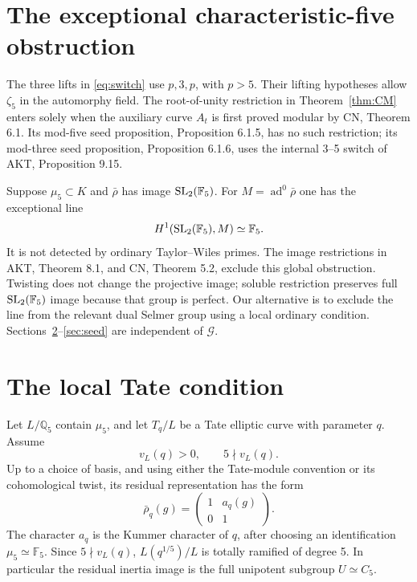 \documentclass[11pt,a4paper]{article}
\theoremstyle{definition}\newtheorem{definition}[theorem]{Definition}
\theoremstyle{remark}\newtheorem*{remark}{Remark}
\newcommand{\Q}{\mathbb Q}\newcommand{\Z}{\mathbb Z}
\newcommand{\F}{\mathbb F}\newcommand{\OO}{\mathcal O}
\newcommand{\ad}{\operatorname{ad}}\newcommand{\Inf}{\operatorname{Inf}}
\newcommand{\Ginput}{\mathcal G}
\begin{document}
\section{The exceptional characteristic-five obstruction}
\label{sec:exception}

The three lifts in \eqref{eq:switch} use $p,3,p$, with $p>5$. Their lifting
hypotheses allow $\zeta_5$ in the automorphy field. The root-of-unity restriction
in Theorem~\ref{thm:CM} enters solely when the auxiliary curve $A_t$ is first
proved modular by CN, Theorem 6.1. Its mod-five seed proposition, Proposition
6.1.5, has no such restriction; its mod-three seed proposition, Proposition
6.1.6, uses the internal 3--5 switch of AKT, Proposition 9.15.

Suppose $\mu_5\subset K$ and $\bar\rho$ has image $\SL_2(\F_5)$.
For $M=\ad^0\bar\rho$ one has the exceptional line
\begin{equation}\label{eq:lie}
H^1(\SL_2(\F_5),M)\simeq\F_5.
\end{equation}
It is not detected by ordinary Taylor--Wiles primes. The image restrictions in
AKT, Theorem 8.1, and CN, Theorem 5.2, exclude this global obstruction.
Twisting does not change the projective image; soluble restriction preserves
full $\SL_2(\F_5)$ image because that group is perfect. Our alternative is to
exclude the line from the relevant dual Selmer group using a local ordinary
condition. Sections~\ref{sec:local}--\ref{sec:seed} are independent of $\Ginput$.

\section{The local Tate condition}
\label{sec:local}

Let $L/\Q_5$ contain $\mu_5$, and let $T_q/L$ be a Tate elliptic curve with
parameter $q$. Assume
\begin{equation}\label{eq:tate}
 v_L(q)>0,\qquad 5\nmid v_L(q).
\end{equation}
Up to a choice of basis, and using either the Tate-module convention or its
cohomological twist, its residual representation has the form
\[
 \bar\rho_q(g)=\begin{pmatrix}1&a_q(g)\\0&1\end{pmatrix}.
\]
The character $a_q$ is the Kummer character of $q$, after choosing an
identification $\mu_5\simeq\F_5$. Since $5\nmid v_L(q)$,
$L(q^{1/5})/L$ is totally ramified of degree 5. In particular the residual
inertia image is the full unipotent subgroup $U\simeq C_5$.
\end{document}
